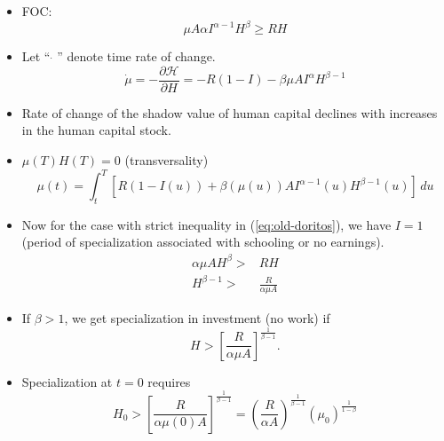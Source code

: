 \documentclass[12pt,compress,handout]{beamer}  %
\begin{document}
\begin{frame}
\begin{itemize}[<+->]
\item
FOC:
\begin{equation}
\mu A\alpha I^{\alpha -1}H^\beta \geq RH \tag{$*$} \label{eq:old-doritos}
\end{equation}

\item
Let ``\,$\dot{~}$\,'' denote time rate of change.
\begin{equation*}
\dot{\mu} =-\frac{\partial \mathcal{H}}{\partial H} =-R(1-I)-\beta
\mu AI^\alpha H^{\beta -1}
\end{equation*}

\item
Rate of change of the shadow value of human capital declines with
increases in the human capital stock.

\item
$\mu (T)H(T) = 0$ (transversality)
\begin{equation*}
\mu(t) = \int_{t}^{T} \left[ R(1 - I(u)) + \beta (\mu(u)) AI^{\alpha
- 1}(u) H^{\beta - 1} (u) \right]\,du
\end{equation*}
\end{itemize}
\end{frame}


\begin{frame}
\begin{itemize}[<+->]
\item
Now for the case with strict inequality in (\ref{eq:old-doritos}),
we have $I=1$ (period of specialization  associated with schooling
or no earnings).
\begin{align*}
\alpha \mu AH^\beta >& RH \\
H^{\beta -1} >& \frac R{\alpha \mu A}
\end{align*}

\item
If $\beta >1$, we get specialization in investment (no work) if
\begin{equation*}
H>\left[ \frac R{\alpha \mu A}\right] ^{\frac 1{\beta -1}}.
\end{equation*}
\end{itemize}
\end{frame}


\begin{frame}
\begin{itemize}[<+->]
\item
Specialization at $t=0$ requires
\begin{equation*}
H_0>\left[ \frac R{\alpha \mu (0)A}\right] ^{\frac 1{\beta
-1}}=\left( \frac R{\alpha A}\right) ^{\frac 1{\beta -1}}(\mu_{0}
)^{\frac 1{1-\beta }}
\end{equation*}
\end{itemize}
\end{frame}
\end{document}
